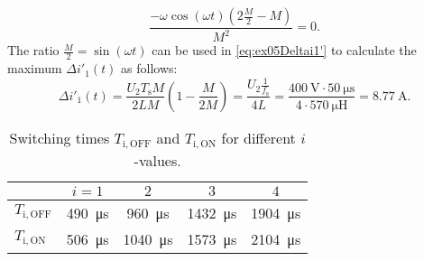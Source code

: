 \begin{solutionblock}
    \begin{equation}
        \frac{-\omega \cos(\omega t)(2 \frac{M}{2}-M)}{M^2}=0.
    \end{equation}
    The ratio $\frac{M}{2}=\sin(\omega t)$ can be used in \eqref{eq:ex05Deltai1'} to calculate the maximum $\Delta i'_{\mathrm{1}}(t)$ as follows:
    \begin{equation}
        \Delta i'_{\mathrm{1}}(t) = \frac{U_{\mathrm{2}}T_{\mathrm{s}}M}{2LM}\left(1-\frac{M}{2M}\right) = \frac{U_{\mathrm{2}}\frac{1}{f_\mathrm{s}}}{4L}=\frac{\SI{400}{\volt}\cdot \SI{50}{\micro\s}}{4\cdot\SI{570}{\micro\henry}} = \SI{8.77}{\ampere}.
    \end{equation}
\end{solutionblock}


\begin{table}[ht]
    \centering
    
    \begin{tabular}{lcccc}
        \toprule
        & $i = 1$ & $2$ & $3$ & $4$ \\
        \midrule
       $T_\mathrm{i,OFF}$& \SI{490}{\micro\second} & \SI{960}{\micro\second} & \SI{1432}{\micro\second} & \SI{1904}{\micro\second} \\
        $T_\mathrm{i,ON}$  & \SI{506}{\micro\second} & \SI{1040}{\micro\second} & \SI{1573}{\micro\second} & \SI{2104}{\micro\second} \\
        \bottomrule
    \end{tabular}
    \caption{Switching times $T_\mathrm{i,OFF}$ and $T_\mathrm{i,ON}$ for different $i$-values.}
    \label{tab:switching_times}
\end{table}

